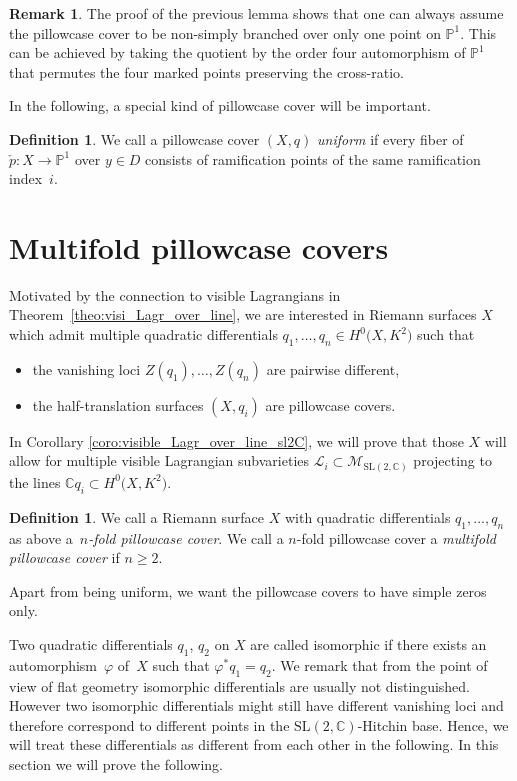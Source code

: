 \documentclass[pdftex]{sigma}
\numberwithin{equation}{section}
\theoremstyle{definition}
\newtheorem{defi}[theo]{Definition}
\newtheorem{rema}[theo]{Remark}
\renewcommand{\to}{\rightarrow}
\newcommand{\calL}{\mathcal{L}}
\newcommand{\calM}{\mathcal{M}}
\newcommand{\CC}{\mathbb{C}}
\newcommand{\PP}{\mathbb{P}}
\newcommand{\SL}{\mathrm{SL}}
\begin{document}
\begin{rema}
 The proof of the previous lemma shows that one can always assume the pillowcase cover to be non-simply branched over only one point on $\PP^1$. This can be achieved by taking the quotient by the order four automorphism of $\PP^1$ that permutes the four marked points preserving the cross-ratio.
\end{rema}

In the following, a special kind of pillowcase cover will be important.
\begin{defi}\label{defi:uniform_pillow_cover}
	We call a pillowcase cover $(X,q)$ \emph{uniform} if every fiber of $\check{p}\colon X \to \PP^1$ over $y \in D$ consists of ramification points of the same ramification index~$i$.
\end{defi}

\section{Multifold pillowcase covers} \label{sec:pill-sever-ways}

Motivated by the connection to visible Lagrangians in Theorem~\ref{theo:visi_Lagr_over_line}, we are interested in Riemann surfaces $X$ which admit multiple quadratic differentials $q_1,\dots,q_n \in H^0\bigl(X,K^{2}\bigr)$ such that
\begin{itemize}\itemsep=0pt
	\item the vanishing loci $Z(q_1), \dots, Z(q_n)$ are pairwise different,
	\item the half-translation surfaces $(X, q_i)$ are pillowcase covers.
 \end{itemize}
In Corollary \ref{coro:visible_Lagr_over_line_sl2C}, we will prove that those $X$ will allow for multiple visible Lagrangian subvarieties $\calL_i \subset \calM_{\SL(2,\CC)}$ projecting to the lines $\CC q_i \subset H^0\bigl(X,K^{2}\bigr)$.
\begin{defi}
	We call a Riemann surface $X$ with quadratic differentials $q_1,\dots,q_n$ as above a~\emph{$n$-fold pillowcase cover}.
	We call a $n$-fold pillowcase cover a \emph{multifold pillowcase cover} if $n \geq 2$.
\end{defi}

Apart from being uniform, we want the pillowcase covers to have simple zeros only.

Two quadratic differentials $q_1$, $q_2$ on $X$ are called isomorphic if there exists an automorphism~$\varphi$ of~$X$ such that $\varphi^* q_1 = q_2$.
We remark that from the point of view of flat geometry isomorphic differentials are usually not distinguished.
However two isomorphic differentials might still have different vanishing loci and therefore correspond to different points in the $\SL(2,\CC)$-Hitchin base. Hence, we will treat these differentials as different from each other in the following.
In this section we will prove the following.
\end{document}
